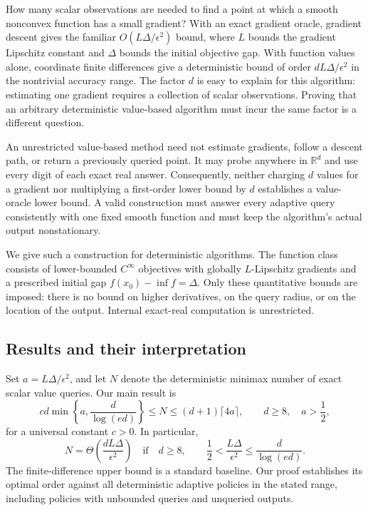 \documentclass[11pt]{article}
\numberwithin{equation}{section}
\theoremstyle{definition}
\theoremstyle{remark}
\newcommand{\R}{\mathbb{R}}
\begin{document}
How many scalar observations are needed to find a point at which a smooth
nonconvex function has a small gradient? With an exact gradient oracle,
gradient descent gives the familiar $O(L\Delta/\epsilon^2)$ bound, where
$L$ bounds the gradient Lipschitz constant and $\Delta$ bounds the initial
objective gap. With function values alone, coordinate finite differences
give a deterministic bound of order $dL\Delta/\epsilon^2$ in the
nontrivial accuracy range. The factor $d$ is easy to explain for this
algorithm: estimating one gradient requires a collection of scalar
observations. Proving that an arbitrary deterministic value-based algorithm
must incur the same factor is a different question.

An unrestricted value-based method need not estimate gradients, follow a
descent path, or return a previously queried point. It may probe anywhere
in $\R^d$ and use every digit of each exact real answer. Consequently,
neither charging $d$ values for a gradient nor multiplying a first-order
lower bound by $d$ establishes a value-oracle lower bound. A valid
construction must answer every adaptive query consistently with one fixed
smooth function and must keep the algorithm's actual output nonstationary.

We give such a construction for deterministic algorithms. The function
class consists of lower-bounded $C^\infty$ objectives with globally
$L$-Lipschitz gradients and a prescribed initial gap
$f(x_0)-\inf f=\Delta$. Only these quantitative bounds are imposed:
there is no bound on higher derivatives, on the query radius, or on the
location of the output. Internal exact-real computation is unrestricted.

\subsection{Results and their interpretation}

Set $a=L\Delta/\epsilon^2$, and let $N$ denote the deterministic minimax
number of exact scalar value queries. Our main result is
\begin{equation}
 cd\min\!\left\{a,\frac{d}{\log(ed)}\right\}
 \leq N\leq(d+1)\lceil4a\rceil,
 \qquad d\geq8,\quad a>\frac12,
 \label{eq:intro-lower}
\end{equation}
for a universal constant $c>0$. In particular,
\begin{equation}
 N=\Theta\!\left(\frac{dL\Delta}{\epsilon^2}\right)
 \quad\text{if}\quad
 d\geq8,\qquad \frac12<\frac{L\Delta}{\epsilon^2}
                   \leq\frac{d}{\log(ed)}.
 \label{eq:intro-matching}
\end{equation}
The finite-difference upper bound is a standard baseline. Our proof
establishes its optimal order against all deterministic adaptive policies
in the stated range, including policies with unbounded queries and
unqueried outputs.
\end{document}
